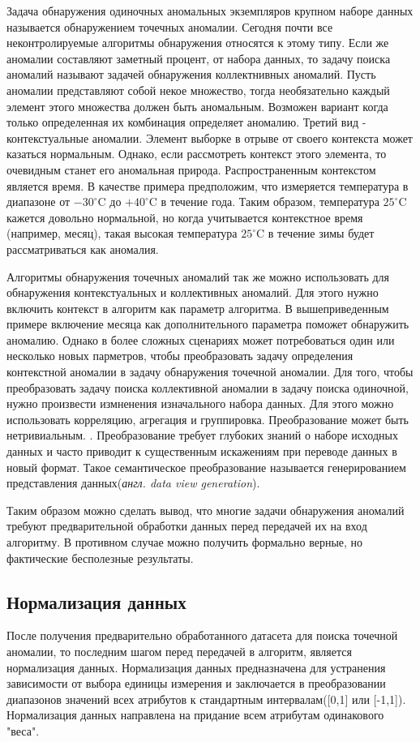 Задача обнаружения одиночных аномальных экземпляров  крупном наборе данных называется обнаружением точечных аномалии\cite{Book04}. Сегодня почти все  неконтролируемые алгоритмы обнаружения  относятся к этому типу. Если же аномалии составляют заметный процент, от набора данных, то задачу поиска аномалий называют задачей обнаружения коллектнивных аномалий. Пусть аномалии представляют собой некое множество, тогда необязательно каждый элемент этого множества должен быть аномальным. Возможен вариант когда только определенная их комбинация определяет аномалию.  Третий вид  -  контекстуальные аномалии. Элемент выборке в отрыве от своего контекста может казаться нормальным. Однако, если рассмотреть контекст этого элемента, то очевидным станет его аномальная природа.
 Распространенным контекстом является время. В качестве примера предположим, что  измеряется температура в диапазоне от $-30^{\circ}$C до $+40^{\circ}$C в течение года. Таким образом, температура $25^{\circ}$C кажется довольно нормальной, но когда  учитывается контекстное время (например, месяц), такая высокая температура $25^{\circ}$C  в течение зимы  будет рассматриваться как аномалия.

Алгоритмы обнаружения точечных аномалий так же можно использовать для обнаружения контекстуальных и коллективных аномалий. Для этого нужно включить контекст в алгоритм как параметр алгоритма. В вышеприведенным примере включение месяца как дополнительного параметра поможет обнаружить аномалию. Однако в более сложных сценариях может потребоваться один или несколько новых парметров, чтобы преобразовать задачу определения контекстной аномалии в задачу обнаружения точечной аномалии.  Для того, чтобы преобразовать задачу поиска коллективной аномалии в задачу поиска одиночной, нужно произвести измненения изначального набора данных. Для этого можно использовать корреляцию, агрегация и группировка. Преобразование  может быть нетривиальным.\cite{Book05} . 
Преобразование требует глубоких знаний о наборе исходных данных и часто приводит  к существенным искажениям при переводе данных в новый формат. Такое семантическое преобразование называется  генерированием представления данных(\textit{англ. data view generation}).
  
  Таким образом можно сделать вывод, что многие задачи обнаружения аномалий требуют предварительной обработки данных перед передачей их на вход алгоритму. В противном случае можно получить формально верные, но фактические бесполезные результаты.
\subsection{Нормализация данных} 
После получения предварительно обработанного датасета для поиска точечной аномалии, то последним шагом перед передачей в алгоритм, является нормализация данных. Нормализация данных предназначена для устранения зависимости от выбора единицы измерения и заключается в преобразовании диапазонов значений всех атрибутов к стандартным интервалам([0,1] или [-1,1])\cite{Book06}. Нормализация данных направлена на придание всем атрибутам одинакового "веса".
